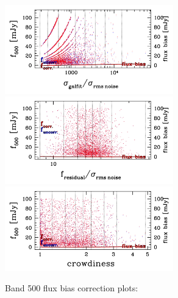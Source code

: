 \documentclass[11pt,a4paper]{article}
\begin{document}
\begin{figure}[H]
	\caption{
		Band 500 flux bias correction plots:
	}
	\includegraphics[width=0.65\textwidth]{galsim_500_fbias_1}
	\includegraphics[width=0.65\textwidth]{galsim_500_fbias_2}
	\includegraphics[width=0.65\textwidth]{galsim_500_fbias_3}
\end{figure}
\end{document}
